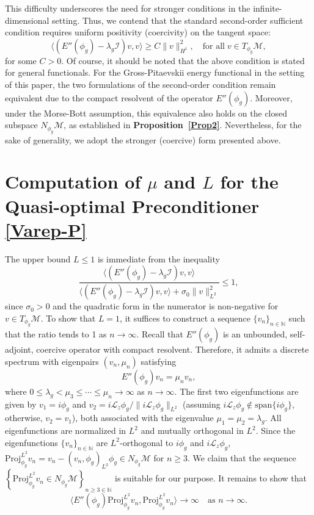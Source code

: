 \documentclass[preprint,3p]{elsarticle}
\begin{document}
This difficulty underscores the need for stronger conditions in the infinite-dimensional setting. Thus, we contend that the standard second-order sufficient condition requires uniform positivity (coercivity) on the tangent space:
\[
\langle (E''(\phi_g) - \lambda_g \mathcal{I}) v, v \rangle \geq C \|v\|_{H^1}^2, \quad {\text{for all}}\; v \in T_{\phi_g}\mathcal{M},
\]
for some $C > 0$. {Of course, it should be noted that the above condition is stated for general functionals. For the Gross-Pitaevskii energy functional in the setting of this paper, the two formulations of the second-order condition remain equivalent due to the compact resolvent of the operator $E''(\phi_g)$. Moreover, under the Morse-Bott assumption, this equivalence also holds on the closed subspace $N_{\phi_g}\mathcal{M}$, as established in \textbf{Proposition~\ref{Prop2}}. Nevertheless, for the sake of generality, we adopt the stronger (coercive) form presented above.}

\section{Computation of $\mu$ and $L$ for the Quasi-optimal Preconditioner \eqref{Varep-P}}\label{Appendix-Opt-Pre}

The upper bound $L \leq 1$ is immediate from the inequality
\[
\frac{\langle (E''(\phi_g) - \lambda_g \mathcal{I}) v, v \rangle}{\langle (E''(\phi_g) - \lambda_g \mathcal{I}) v, v \rangle + \sigma_0 \|v\|_{L^2}^2} \leq 1,
\]
since $\sigma_0 > 0$ and the quadratic form in the numerator is non-negative for $v \in T_{\phi_g}\mathcal{M}$. To show that $L = 1$, it suffices to construct a sequence $\{v_n\}_{n\in\mathbb{N}}$ such that the ratio tends to 1 as $n \to \infty$. Recall that $E''(\phi_g)$ is an unbounded, self-adjoint, coercive operator with compact resolvent. Therefore, it admits a discrete spectrum with eigenpairs $(v_n, \mu_n)$ satisfying
\[
E''(\phi_g) v_n = \mu_n v_n,
\]
where $0 \leq \lambda_g < \mu_3 \leq \cdots \leq \mu_n \to \infty$ as $n \to \infty$. The first two eigenfunctions are given by $v_1 = i\phi_g$ and $v_2 = i\mathcal{L}_z \phi_g / \|i\mathcal{L}_z \phi_g\|_{L^2}$ (assuming $i\mathcal{L}_z \phi_g \not\in \mathrm{span}\{i\phi_g\}$, otherwise, $v_2 = v_1$), both associated with the eigenvalue $\mu_1 = \mu_2 = \lambda_g$. All eigenfunctions are normalized in $L^2$ and mutually orthogonal in $L^2$.
Since the eigenfunctions $\{v_n\}_{n\in\mathbb{N}}$ are $L^2$-orthogonal to $i\phi_g$ and $i\mathcal{L}_z\phi_g$, 
{$\text{Proj}_{\phi_g}^{L^2}v_n = v_n - (v_n, \phi_g )_{L^2} \phi_g \in N_{\phi_g}\mathcal{M}$} for $n\ge3$. We claim that the sequence $\left\{\text{Proj}_{\phi_g}^{L^2}v_n\in N_{\phi_g}\mathcal{M}\right\}_{n\ge3\in\mathbb{N}}$ is suitable for our purpose. It remains to show that 
\[
\langle E''(\phi_g) \text{Proj}_{\phi_g}^{L^2} v_n, \text{Proj}_{\phi_g}^{L^2} v_n \rangle \to \infty \quad \text{as } n \to \infty.
\]
\end{document}
